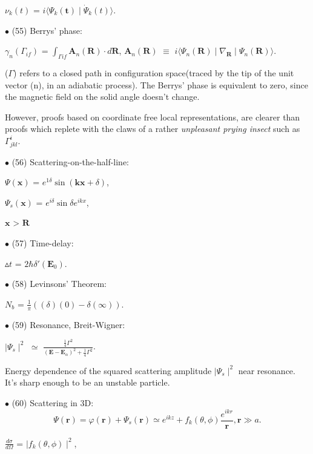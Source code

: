 \documentclass[a4paper, 10pt, onepage]{elegantbook}
\begin{document}
{$\nu_k(t)$ = $i \langle  \Psi_k(\mathbf t) \mid {\dot \Psi_k}(t) \rangle$. 

$\bullet$ (55) Berrys' phase:  

$\gamma_n(\Gamma_{if})$ = $\int_{\Gamma if} \mathbf A_n(\mathbf R) \cdot  d{\mathbf R}$, $ \mathbf A_n(\mathbf R)$ 
$\equiv$ $ i \langle \Psi_n(\mathbf R) \mid \nabla_{\mathbf R} \mid \Psi_n(\mathbf R) \rangle$. 

($\Gamma$) refers to a closed path in configuration space(traced by the tip of the unit vector (n), in an adiabatic 
process). The Berrys' phase is equivalent to zero, since the magnetic field on the solid angle doesn't change.  

However, proofs based on coordinate free local representations, are clearer than proofs which replete with the claws of 
a rather \emph{unpleasant prying insect} such as $\Gamma^i_{jkl}$. 

$\bullet$ (56) Scattering-on-the-half-line:  

$\Psi(\mathbf x)$ = $e^{1 \delta} \sin(\mathbf {kx} + \delta)$,  

$\Psi_s(\mathbf x)$ = $e^{i \delta} \sin \delta e^{ikx}$,  

$\mathbf x$ > $ \mathbf R$  

$\bullet$ (57) Time-delay:  

$\vartriangle t$ = $2\hbar \delta'( \mathbf E_0)$.  


$\bullet$ (58) Levinsons' Theorem:  

$\mathit N_b$ = $\frac{1}{\pi} ((\delta)(0) - \delta(\infty))$.  


$\bullet$ (59) Resonance, Breit-Wigner:  

$\mid \Psi_s \mid^2$ $\simeq$ $\frac{ \frac{1}{4} \Gamma^2} {(\mathbf E - \mathbf E_\alpha)^2 + \frac{1}{4} \Gamma^2}$. 
 

Energy dependence of the squared scattering amplitude $ \mid \Psi_s \mid^2$ near resonance. It's sharp enough to be an 
unstable particle. 

$\bullet$ (60) Scattering in 3D:  
\begin{equation}
\Psi(\mathbf r) = \varphi(\mathbf r) + \Psi_s(\mathbf r) \simeq e^{ikz} + f_k(\theta, \phi) \frac{e^{ikr}}{\mathbf r}, 
\mathbf r \gg a.
\end{equation}

$\frac{d \sigma}{d \Omega}$ = $\mid f_k(\theta, \phi) \mid^2$,  

}
\end{document}
